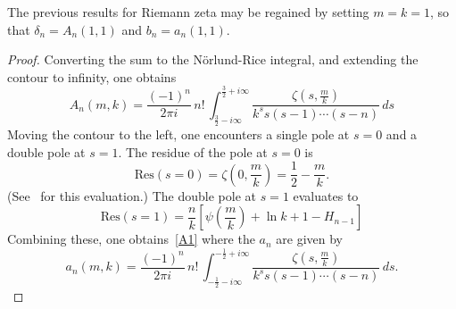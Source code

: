 \documentclass{amsart}
\begin{document}
The previous results for Riemann zeta may be regained by setting 
$m=k=1$, so that $\delta_n=A_n(1,1)$ and $b_n=a_n(1,1)$.


\begin{proof}
 Converting the sum to the N\"orlund-Rice integral, and extending the
contour to infinity, one obtains 
\begin{equation}
A_{n}(m,k)=\frac{(-1)^{n}}{2\pi i}\, n!\,
\int_{\frac{3}{2}-i\infty}^{\frac{3}{2}+i\infty}
\frac{\zeta\left(s,\frac{m}{k}\right)}{k^{s}s(s-1)\cdots(s-n)}\, ds
\end{equation}
 Moving the contour to the left, one encounters a single pole at $s=0$
and a double pole at $s=1$. The residue of the pole at $s=0$ is
\begin{equation*}
\mbox{Res}(s=0)=\zeta\left(0,\frac{m}{k}\right)=\frac{1}{2}-\frac{m}{k}.
\end{equation*}
(See~\cite[p.~271]{WhWa27} for this evaluation.)
The double pole at $s=1$ evaluates to
\begin{equation*}
\mbox{Res}(s=1)=\frac{n}{k}
\left[\psi\left(\frac{m}{k}\right)+\ln k+1-H_{n-1}\right]
\end{equation*}
Combining these, one obtains~\eqref{A1}
where the $a_n$ are given by
\begin{equation}\label{defa}
a_{n}(m,k)=\frac{(-1)^{n}}{2\pi i}\, n!\,
\int_{-\frac{1}{2}-i\infty}^{-\frac{1}{2}+i\infty}
\frac{\zeta\left(s,\frac{m}{k}\right)}{k^{s}s(s-1)\cdots(s-n)}\, ds.
\end{equation}


\end{proof}
\end{document}
